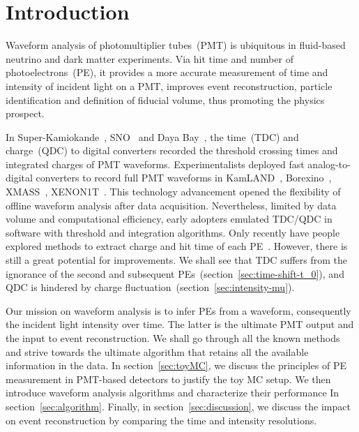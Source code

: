 \section{Introduction}
\label{sec:introduction}

Waveform analysis of photomultiplier tubes~(PMT) is ubiquitous in fluid-based neutrino and dark matter experiments.  Via hit time and number of photoelectrons~(PE), it provides a more accurate measurement of time and intensity of incident light on a PMT, improves event reconstruction, particle identification and definition of fiducial volume, thus promoting the physics prospect.

In Super-Kamiokande~\cite{noauthor_super-kamiokande_2003}, SNO~\cite{dunger_event_2019} and Daya Bay~\cite{daya_bay_collaboration_measurement_2017}, the time~(TDC) and charge~(QDC) to digital converters recorded the threshold crossing times and integrated charges of PMT waveforms.  Experimentalists deployed fast analog-to-digital converters to record full PMT waveforms in KamLAND~\cite{kamland_collaboration_production_2010}, Borexino~\cite{alimonti_borexino_2009}, XMASS~\cite{abe_xmass_2013}, XENON1T~\cite{xenon_collaboration_xenon1t_2019}.  This technology advancement opened the flexibility of offline waveform analysis after data acquisition.  Nevertheless, limited by data volume and computational efficiency, early adopters emulated TDC/QDC in software with threshold and integration algorithms.  Only recently have people explored methods to extract charge and hit time of each PE~\cite{zhang_comparison_2019}.  However, there is still a great potential for improvements.  We shall see that TDC suffers from the ignorance of the second and subsequent PEs~(section~\ref{sec:time-shift-t_0}), and QDC is hindered by charge fluctuation~(section~\ref{sec:intensity-mu}).

Our mission on waveform analysis is to infer PEs from a waveform, consequently the incident light intensity over time.  The latter is the ultimate PMT output and the input to event reconstruction.  We shall go through all the known methods and strive towards the ultimate algorithm that retains all the available information in the data.  In section~\ref{sec:toyMC}, we discuss the principles of PE measurement in PMT-based detectors to justify the toy MC setup.  We then introduce waveform analysis algorithms and characterize their performance In section~\ref{sec:algorithm}.  Finally, in section~\ref{sec:discussion}, we discuss the impact on event reconstruction by comparing the time and intensity resolutions.
